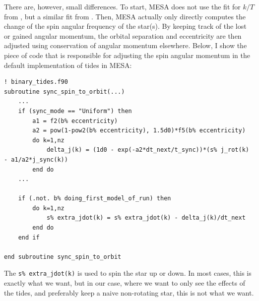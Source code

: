 \documentclass[a4paper,10pt]{article}
\begin{document}
There are, however, small differences. To start, MESA does not use the fit for \(k / T\) from \citet{preece2022}, but a similar fit from \citet{hurley1902}. Then, MESA actually only directly computes the change of the spin angular frequency of the star(s). By keeping track of the lost or gained angular momentum, the orbital separation and eccentricity are then adjusted using conservation of angular momentum elsewhere. Below, I show the piece of code that is responsible for adjusting the spin angular momentum in the default implementation of tides in MESA:
\begin{verbatim}
! binary_tides.f90
subroutine sync_spin_to_orbit(...)
    ...
    if (sync_mode == "Uniform") then
        a1 = f2(b% eccentricity)
        a2 = pow(1-pow2(b% eccentricity), 1.5d0)*f5(b% eccentricity)
        do k=1,nz
            delta_j(k) = (1d0 - exp(-a2*dt_next/t_sync))*(s% j_rot(k) - a1/a2*j_sync(k))
        end do
    ...

    if (.not. b% doing_first_model_of_run) then
        do k=1,nz
            s% extra_jdot(k) = s% extra_jdot(k) - delta_j(k)/dt_next
        end do
    end if

end subroutine sync_spin_to_orbit
\end{verbatim}

The \lstinline[style=output, breaklines=true]|s% extra_jdot(k)| is used to spin the star up or down. In most cases, this is exactly what we want, but in our case, where we want to only see the effects of the tides, and preferably keep a naive non-rotating star, this is not what we want.
\end{document}
